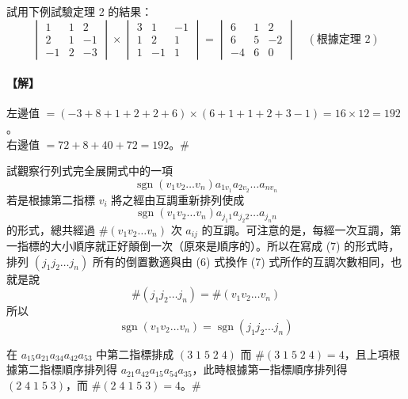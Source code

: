 \begin{example}\label{ex:b6s-1-25}
試用下例試驗定理 2 的結果：
\[ \begin{vmatrix}
1 & 1 & 2 \\
2 & 1 & -1 \\
-1 & 2 & -3
\end{vmatrix} \times \begin{vmatrix}
3 & 1 & -1 \\
1 & 2 & 1 \\
1 & -1 & 1
\end{vmatrix} = \begin{vmatrix}
6 & 1 & 2 \\
6 & 5 & -2 \\
-4 & 6 & 0
\end{vmatrix} \quad (\text{根據定理 2}) \]
\end{example}

\paragraph{【解】}
左邊值 $=(-3+8+1+2+2+6)\times(6+1+1+2+3-1) = 16 \times 12 = 192$。\\
右邊值 $=72+8+40+72 = 192$。\hfill$\#$

試觀察行列式完全展開式中的一項
\begin{equation}
\operatorname{sgn}(v_1 v_2 \dots v_n) a_{1v_1} a_{2v_2} \dots a_{nv_n} \label{eq:b6s-1-6-6}
\end{equation}
若是根據第二指標 $v_i$ 將之經由互調重新排列使成
\begin{equation}
\operatorname{sgn}(v_1 v_2 \dots v_n) a_{j_1 1} a_{j_2 2} \dots a_{j_n n} \label{eq:b6s-1-6-7}
\end{equation}
的形式，總共經過 $\#(v_1 v_2 \dots v_n)$ 次 $a_{ij}$ 的互調。可注意的是，每經一次互調，第一指標的大小順序就正好顛倒一次（原來是順序的）。所以在寫成 (7) 的形式時，排列 $(j_1 j_2 \dots j_n)$ 所有的倒置數適與由 (6) 式換作 (7) 式所作的互調次數相同，也就是說
\[ \#(j_1 j_2 \dots j_n) = \#(v_1 v_2 \dots v_n) \]
所以
\begin{equation}
\operatorname{sgn}(v_1 v_2 \dots v_n) = \operatorname{sgn}(j_1 j_2 \dots j_n) \label{eq:b6s-1-6-8}
\end{equation}

\begin{example}\label{ex:b6s-1-26}
在 $a_{15} a_{21} a_{34} a_{42} a_{53}$ 中第二指標排成 $(3 \; 1 \; 5 \; 2 \; 4)$ 而 $\#(3 \; 1 \; 5 \; 2 \; 4) = 4$，且上項根據第二指標順序排列得 $a_{21} a_{42} a_{15} a_{54} a_{35}$，此時根據第一指標順序排列得 $(2 \; 4 \; 1 \; 5 \; 3)$，而 $\#(2 \; 4 \; 1 \; 5 \; 3) = 4$。\hfill$\#$
\end{example}

